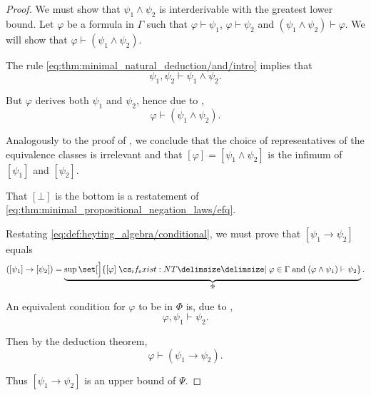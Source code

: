 \begin{proof}
  We must show that \( \psi_1 \wedge \psi_2 \) is interderivable with the greatest lower bound. Let \( \varphi \) be a formula in \( \Gamma \) such that \( \varphi \vdash \psi_1 \), \( \varphi \vdash \psi_2 \) and \( (\psi_1 \wedge \psi_2) \vdash \varphi \). We will show that \( \varphi \vdash (\psi_1 \wedge \psi_2) \).

  The rule \eqref{eq:thm:minimal_natural_deduction/and/intro} implies that
  \begin{equation*}
    \psi_1, \psi_2 \vdash \psi_1 \wedge \psi_2.
  \end{equation*}

  But \( \varphi \) derives both \( \psi_1 \) and \( \psi_2 \), hence due to ,
  \begin{equation*}
    \varphi \vdash (\psi_1 \wedge \psi_2).
  \end{equation*}

  Analogously to the proof of , we conclude that the choice of representatives of the equivalence classes is irrelevant and that \( [\varphi] = [\psi_1 \wedge \psi_2] \) is the infimum of \( [\psi_1] \) and \( [\psi_2] \).

   That \( [\bot] \) is the bottom is a restatement of \eqref{eq:thm:minimal_propositional_negation_laws/efq}.

   Restating \eqref{eq:def:heyting_algebra/conditional}, we must prove that \( [\psi_1 \rightarrow \psi_2] \) equals
  \begin{equation*}
    ([\psi_1] \rightarrow [\psi_2]) = \underbrace{\sup\set[\Big]{ [\varphi] \given* \varphi \in \Gamma \T{and} (\varphi \wedge \psi_1) \vdash \psi_2 }}_{\Phi}.
  \end{equation*}

  An equivalent condition for \( \varphi \) to be in \( \Phi \) is, due to ,
  \begin{equation*}
    \varphi, \psi_1 \vdash \psi_2.
  \end{equation*}

  Then by the deduction theorem,
  \begin{equation*}
    \varphi \vdash (\psi_1 \rightarrow \psi_2).
  \end{equation*}

  Thus \( [\psi_1 \rightarrow \psi_2] \) is an upper bound of \( \Psi \).


\end{proof}
